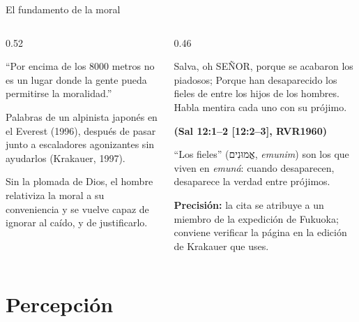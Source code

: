 \documentclass[hyperref={bookmarks=false},aspectratio=169]{beamer}
\newcommand{\heb}[1]{\mbox{\foreignlanguage{hebrew}{#1}}}
\newcommand{\SENOR}{S{\fontsize{0.78em}{1em}\selectfont EÑOR}}
\newcommand{\fuente}[1]{\par\hfill{\upshape\bfseries\footnotesize\textcolor{azul}{#1}}}
\newcommand{\precision}[1]{{\footnotesize\color{gris}\textbf{Precisión:} #1}}
\begin{document}
\begin{frame}{El fundamento de la moral}
\begin{columns}[c,onlytextwidth]
\begin{column}{0.52\textwidth}
\begin{tcolorbox}[colback=papiro,colframe=dorado,boxrule=1.2pt,arc=3pt]
\centering\small ``Por encima de los 8000 metros no es un lugar donde la gente pueda permitirse la moralidad.''
\end{tcolorbox}
\scriptsize Palabras de un alpinista japonés en el Everest (1996), después de pasar junto a escaladores agonizantes sin ayudarlos (Krakauer, 1997).\par\medskip
\small Sin la plomada de Dios, el hombre relativiza la moral a su conveniencia y se vuelve capaz de ignorar al caído, y de justificarlo.
\end{column}
\begin{column}{0.46\textwidth}
\begin{cita}Salva, oh \SENOR{}, porque se acabaron los piadosos; Porque han desaparecido los fieles de entre los hijos de los hombres. Habla mentira cada uno con su prójimo.\fuente{(Sal 12:1--2 [12:2--3], RVR1960)}\end{cita}
\scriptsize ``Los fieles'' (\heb{אֱמוּנִים}, \emph{emunim}) son los que viven en \emph{emuná}: cuando desaparecen, desaparece la verdad entre prójimos.\par\smallskip
\precision{la cita se atribuye a un miembro de la expedición de Fukuoka; conviene verificar la página en la edición de Krakauer que uses.}
\end{column}
\end{columns}
\end{frame}

\section{Percepción}
\end{document}
